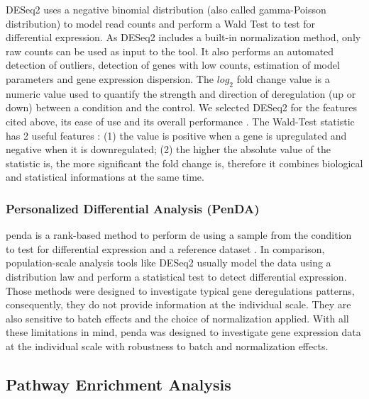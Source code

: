 DESeq2 uses a negative binomial distribution (also called gamma-Poisson distribution) to model read counts and perform a Wald Test to test for differential expression.
As DESeq2 includes a built-in normalization method, only raw counts can be used as input to the tool.
It also performs an automated detection of outliers, detection of genes with low counts, estimation of model parameters and gene expression dispersion.
The $log_2$ fold change value is a numeric value used to quantify the strength and direction of deregulation (up or down) between a condition and the control.
We selected DESeq2 for the features cited above, its ease of use and its overall performance \cite*{Love2014}.
The Wald-Test statistic has 2 useful features : (1) the value is positive when a gene is upregulated and negative when it is downregulated; (2) the higher the absolute value of the statistic is, the more significant the fold change is, therefore it combines biological and statistical informations at the same time.

\subsubsection{ Personalized Differential Analysis (PenDA)}

\acrshort{penda} is a rank-based method to perform \acrshort{de} using a sample from the condition to test for differential expression and a reference dataset \cite*{Richard2020}.
In comparison, population-scale analysis tools like DESeq2 usually model the data using a distribution law and perform a statistical test to detect differential expression.
Those methods were designed to investigate typical gene deregulations patterns, consequently, they do not provide information at the individual scale.
They are also sensitive to batch effects and the choice of normalization applied.
With all these limitations in mind, \acrshort{penda} was designed to investigate gene expression data at the individual scale with robustness to batch and normalization effects.

\subsection{Pathway Enrichment Analysis}

